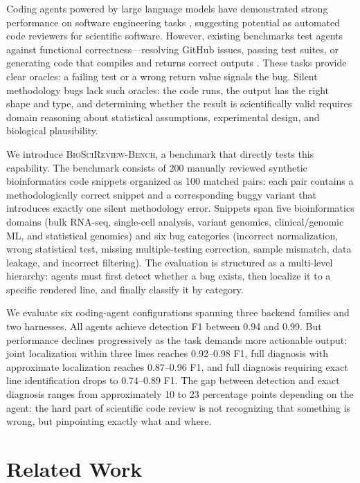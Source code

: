 \documentclass[11pt]{article}
\newcommand{\bench}{\textsc{BioSciReview-Bench}}
\begin{document}
Coding agents powered by large language models have demonstrated strong performance on software engineering tasks \citep{jimenez2024swebench, yang2024sweagent}, suggesting potential as automated code reviewers for scientific software. However, existing benchmarks test agents against functional correctness---resolving GitHub issues, passing test suites, or generating code that compiles and returns correct outputs \citep{chen2021humaneval, austin2021program, hendrycks2021apps}. These tasks provide clear oracles: a failing test or a wrong return value signals the bug. Silent methodology bugs lack such oracles: the code runs, the output has the right shape and type, and determining whether the result is scientifically valid requires domain reasoning about statistical assumptions, experimental design, and biological plausibility.

We introduce \bench, a benchmark that directly tests this capability. The benchmark consists of 200 manually reviewed synthetic bioinformatics code snippets organized as 100 matched pairs: each pair contains a methodologically correct snippet and a corresponding buggy variant that introduces exactly one silent methodology error. Snippets span five bioinformatics domains (bulk RNA-seq, single-cell analysis, variant genomics, clinical/genomic ML, and statistical genomics) and six bug categories (incorrect normalization, wrong statistical test, missing multiple-testing correction, sample mismatch, data leakage, and incorrect filtering). The evaluation is structured as a multi-level hierarchy: agents must first detect whether a bug exists, then localize it to a specific rendered line, and finally classify it by category.

We evaluate six coding-agent configurations spanning three backend families and two harnesses. All agents achieve detection F1 between 0.94 and 0.99. But performance declines progressively as the task demands more actionable output: joint localization within three lines reaches 0.92--0.98 F1, full diagnosis with approximate localization reaches 0.87--0.96 F1, and full diagnosis requiring exact line identification drops to 0.74--0.89 F1. The gap between detection and exact diagnosis ranges from approximately 10 to 23 percentage points depending on the agent: the hard part of scientific code review is not recognizing that something is wrong, but pinpointing exactly what and where.

\section{Related Work}
\end{document}
